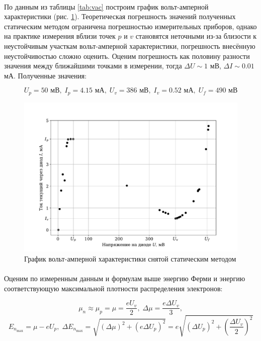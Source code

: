 \documentclass[a4paper,12pt]{article}
\begin{document}
\paragraph{}
	По данным из таблицы \ref{tab:vac} построим график вольт-амперной характеристики (рис. \ref{fig:plot}). Теоретическая погрешность значений полученных статическим методом ограничена погрешностью измерительных приборов, однако на практике измерения вблизи точек $p$ и $v$ становятся неточными из-за близости к неустойчивым участкам вольт-амперной характеристики, погрешность внесённую неустойчивостью сложно оценить. Оценим погрешность как половину разности значения между ближайшими точками в измерении, тогда $\Delta U \sim 1$ мВ, $\Delta I \sim 0.01$ мА. Полученные значения:
	
	\[ U_p = 50 \text{ мВ}, \; I_p = 4.15 \text{ мА}, \; U_v = 386 \text{ мВ}, \; I_v = 0.52 \text{ мА}, \; U_f = 490 \text{ мВ} \]
	
	
\begin{figure}[h]
\centering
\includegraphics[width=\textwidth]{plot.pdf}
\caption{График вольт-амперной характеристики снятой статическим методом}
\label{fig:plot}
\end{figure}

\paragraph{} Оценим по измеренным данным и формулам выше энергию Ферми и энергию соответствующую максимальной плотности распределения электронов:

\[
\mu_n \approx \mu_p = \mu = \frac{eU_v}{2}, \; \Delta \mu = \frac{e \Delta U_v}{3},
\]\[ 
E_{n_{\max}} = \mu - eU_p, \; \Delta E_{n_{\max}} = \sqrt{(\Delta \mu)^2 + (e \Delta U_p)^2} = e \sqrt{(\Delta U_p)^2 + \left(\frac{\Delta U_v}{2}\right)^2}
\]
	
\end{document}
